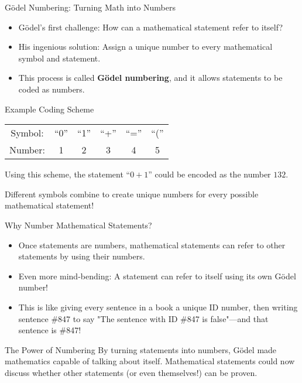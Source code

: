 \documentclass[aspectratio=169]{beamer}
\begin{document}
\begin{frame}{Gödel Numbering: Turning Math into Numbers}

\begin{itemize}
    \item Gödel's first challenge: How can a mathematical statement refer to itself?
    \item His ingenious solution: Assign a unique number to every mathematical symbol and statement.
    \item This process is called \textbf{Gödel numbering}, and it allows statements to be coded as numbers.
\end{itemize}

\begin{block}{Example Coding Scheme}
\begin{tabular}{cccccc}
Symbol: & ``0'' & ``1'' & ``+'' & ``='' & ``('' \\
Number: & 1 & 2 & 3 & 4 & 5
\end{tabular}

\vspace{0.3cm}
Using this scheme, the statement ``$0 + 1$'' could be encoded as the number $132$.

Different symbols combine to create unique numbers for every possible mathematical statement!
\end{block}

\end{frame}

\begin{frame}{Why Number Mathematical Statements?}

\begin{itemize}
    \item Once statements are numbers, mathematical statements can refer to other statements by using their numbers.
    \item Even more mind-bending: A statement can refer to itself using its own Gödel number!
    \item This is like giving every sentence in a book a unique ID number, then writing sentence \#847 to say "The sentence with ID \#847 is false"—and that sentence is \#847!
\end{itemize}

\begin{block}{The Power of Numbering}
By turning statements into numbers, Gödel made mathematics capable of talking about itself. Mathematical statements could now discuss whether other statements (or even themselves!) can be proven.
\end{block}

\end{frame}
\end{document}
